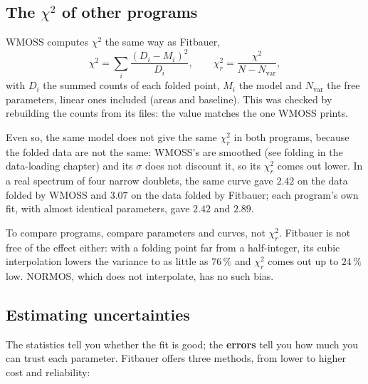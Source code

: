 \subsection{The \texorpdfstring{$\chi^2$}{chi2} of other programs}
\label{sec:chi2-programas}

WMOSS computes $\chi^2$ the same way as Fitbauer,
\[
  \chi^2 = \sum_i \frac{(D_i - M_i)^2}{D_i}, \qquad
  \chi^2_r = \frac{\chi^2}{N - N_\text{var}},
\]
with $D_i$ the summed counts of each folded point, $M_i$ the model and
$N_\text{var}$ the free parameters, linear ones included (areas and baseline).
This was checked by rebuilding the counts from its  files: the value
matches the one WMOSS prints.

Even so, the same model does not give the same $\chi^2_r$ in both programs,
because the folded data are not the same: WMOSS's are smoothed (see folding in
the data-loading chapter) and its $\sigma$ does not discount it, so its
$\chi^2_r$ comes out lower. In a real spectrum of four narrow doublets, the same
curve gave $2.42$ on the data folded by WMOSS and $3.07$ on the data folded by
Fitbauer; each program's own fit, with almost identical parameters, gave $2.42$
and $2.89$.

\begin{nota}
To compare programs, compare parameters and curves, not $\chi^2_r$. Fitbauer is
not free of the effect either: with a folding point far from a half-integer, its
cubic interpolation lowers the variance to as little as $76\,\%$ and $\chi^2_r$
comes out up to $24\,\%$ low. NORMOS, which does not interpolate, has no such
bias.
\end{nota}

\subsection{Estimating uncertainties}

The statistics tell you whether the fit is good; the \textbf{errors} tell you how
much you can trust each parameter. Fitbauer offers three methods, from lower to
higher cost and reliability:


